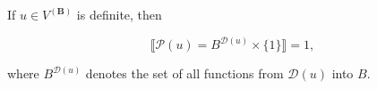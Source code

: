 If $u \in V^{(\mathbf{B})}$ is definite, then

$$\llbracket \mathcal{P}(u) = B^{\mathcal{D}(u)} \times \{1\} \rrbracket = 1,$$

where $B^{\mathcal{D}(u)}$ denotes the set of all functions from $\mathcal{D}(u)$ into $B$.
